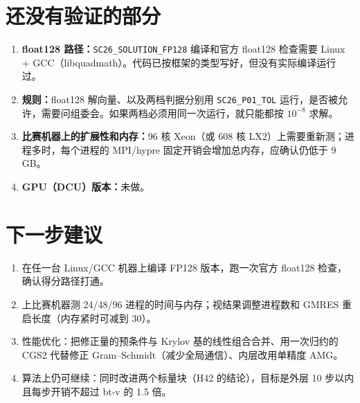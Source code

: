 \documentclass[11pt,a4paper]{ctexart}
\begin{document}
\section{还没有验证的部分}
\begin{enumerate}
\item \textbf{float128 路径：}\texttt{SC26\_SOLUTION\_FP128} 编译和官方 float128 检查需要 Linux + GCC（libquadmath）。代码已按框架的类型写好，但没有实际编译运行过。
\item \textbf{规则：}float128 解向量、以及两档判据分别用 \texttt{SC26\_P01\_TOL} 运行，是否被允许，需要问组委会。如果两档必须用同一次运行，就只能都按 $10^{-8}$ 求解。
\item \textbf{比赛机器上的扩展性和内存：}96 核 Xeon（或 608 核 LX2）上需要重新测；进程多时，每个进程的 MPI/hypre 固定开销会增加总内存，应确认仍低于 9\,GB。
\item \textbf{GPU（DCU）版本：}未做。
\end{enumerate}

\section{下一步建议}
\begin{enumerate}
\item 在任一台 Linux/GCC 机器上编译 FP128 版本，跑一次官方 float128 检查，确认得分路径打通。
\item 上比赛机器测 24/48/96 进程的时间与内存；视结果调整进程数和 GMRES 重启长度（内存紧时可减到 30）。
\item 性能优化：把修正量的预条件与 Krylov 基的线性组合合并、用一次归约的 CGS2 代替修正 Gram--Schmidt（减少全局通信）、内层改用单精度 AMG。
\item 算法上仍可继续：同时改进两个标量块（H42 的结论），目标是外层 10 步以内且每步开销不超过 bt-v 的 1.5 倍。
\end{enumerate}
\end{document}
